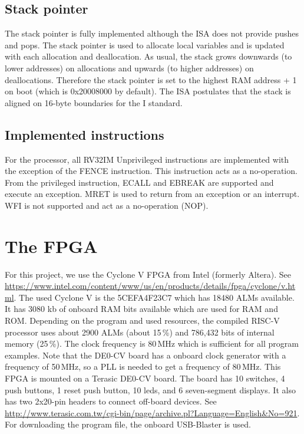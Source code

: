 \documentclass[12pt]{article}
\begin{document}
\subsection{Stack pointer}
The stack pointer is fully implemented although the ISA does not provide pushes and pops. The stack pointer is used to allocate local variables and is updated with each allocation and deallocation. As usual, the stack grows downwards (to lower addresses) on allocations and upwards (to higher addresses) on deallocations. Therefore the stack pointer is set to the highest RAM address + 1 on boot (which is 0x20008000 by default). The ISA postulates that the stack is aligned on 16-byte boundaries for the I standard.

\subsection{Implemented instructions}
For the processor, all RV32IM Unprivileged instructions are implemented with the exception of the FENCE instruction. This instruction acts as a no-operation. From the privileged instruction, ECALL and EBREAK are supported and execute an exception. MRET is used to return from an exception or an interrupt. WFI is not supported and act as a no-operation (NOP).

\section{The FPGA}
For this project, we use the Cyclone V FPGA from Intel (formerly Altera). See \url{https://www.intel.com/content/www/us/en/products/details/fpga/cyclone/v.html}.
The used Cyclone V is the 5CEFA4F23C7 which has 18480 ALMs available. It has 3080 kb of onboard RAM bits available which are used for RAM and ROM. Depending on the program and used resources, the compiled RISC-V processor uses about 2900 ALMs (about 15\,\%) and 786,432 bits of internal memory (25\,\%). The clock frequency is 80\,MHz which is sufficient for all program examples. Note that the DE0-CV board has a onboard clock generator with a frequency of 50\,MHz, so a PLL is needed to get a frequency of 80\,MHz. This FPGA is mounted on a Terasic DE0-CV board. The board has 10 switches, 4 push buttons, 1 reset push button, 10 leds, and 6 seven-segment displays. It also has two 2x20-pin headers to connect off-board devices. See \url{http://www.terasic.com.tw/cgi-bin/page/archive.pl?Language=English&No=921}. For downloading the program file, the onboard USB-Blaster is used.
\end{document}
